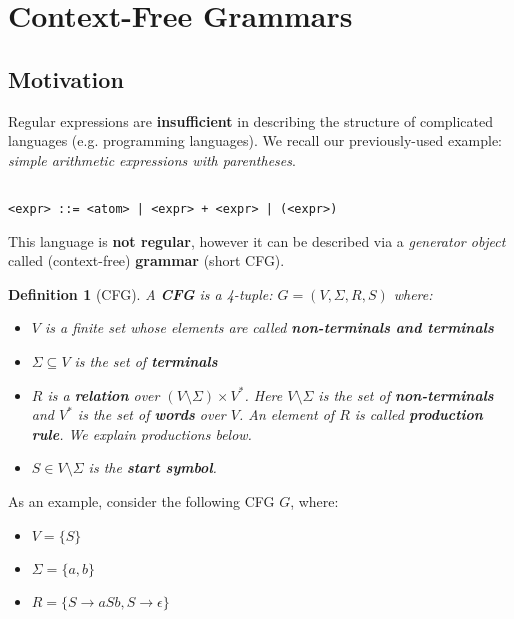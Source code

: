 \documentclass[a4paper, 12pt]{article}
\newtheorem*{theorem}{Definition}
\begin{document}
\section{ Context-Free Grammars }

\subsection{ Motivation }

Regular expressions are \textbf{insufficient} in describing the structure of complicated languages (e.g. programming languages). We recall our previously-used example: \textit{simple arithmetic expressions with parentheses}. 


\begin{verbatim}

<expr> ::= <atom> | <expr> + <expr> | (<expr>)

\end{verbatim}


This language is \textbf{not regular}, however it can be described via a \textit{generator object} called (context-free) \textbf{grammar} (short CFG). 

\begin{theorem}[CFG]

A \textbf{CFG} is a 4-tuple: $G=(V,\Sigma,R,S)$ where:
  \begin{itemize}
  	\item  $V$ is a finite set whose elements are called \textbf{non-terminals and terminals}
  	\item  $\Sigma\subseteq V$ is the set of \textbf{terminals}
  	\item  $R$ is a \textbf{relation} over $(V\setminus\Sigma)\times V^*$. Here $V\setminus\Sigma$ is the set of \textbf{non-terminals} and $V^*$ is the set of \textbf{words} over $V$. An element of $R$ is called \textbf{production rule}. We explain productions below. 
  	\item  $S\in V\setminus\Sigma$ is the \textbf{start symbol}.
  \end{itemize}


\end{theorem}

As an example, consider the following CFG $G$, where:
  \begin{itemize}
  	\item  $V=\{S\}$
  	\item  $\Sigma=\{a,b\}$
  	\item  $R=\{S\rightarrow aSb, S\rightarrow \epsilon\}$
  \end{itemize}
\end{document}

